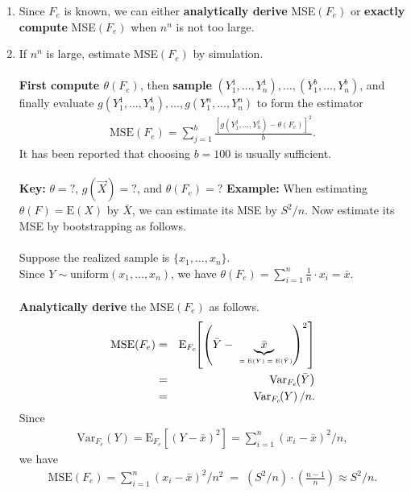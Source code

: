 \documentclass[12pt]{article}
\begin{document}
\begin{enumerate}
\item  Since $F_e$ is known, we can either {\bf analytically derive}
\mbox{MSE$(F_e)$} or  {\bf exactly compute} \mbox{MSE$(F_e)$} when
$n^n$ is not too large.
\\
\item If $n^n$ is large, estimate \mbox{MSE$(F_e)$} by simulation. \\\\
{\bf First compute $\theta(F_e)$}, then {\bf sample}
$(Y_1^1,\ldots,Y_n^1), \ldots, (Y_1^b,\ldots,Y_n^b)$, and finally
evaluate $g(Y_1^1,\ldots,Y_n^1),\ldots, g(Y_1^n,\ldots,Y_n^n)$ to
form the estimator
\begin{eqnarray*}
{\widehat {\mbox{MSE}}} (F_e) =
\sum_{j=1}^b\frac{[g(Y_1^j,\ldots,Y_n^j)-\theta(F_e)]^2}{b}.
\end{eqnarray*}
It has been
reported that choosing $b=100$ is usually sufficient.
\\\\
{\bf Key:} $\theta=?$,  $g({\vec X})=?$, and $\theta(F_e)=?$
\newpage
{\bf Example:} When estimating $\theta(F)={\mbox{E}}(X)$  by ${\bar
X}$, we can estimate its MSE by $S^2/n$. Now estimate its MSE by
bootstrapping as follows.
\\\\
Suppose the realized sample is $\{x_1,\ldots,x_n\}$. \\
Since $Y\sim
\mbox{uniform}(x_1,\ldots,x_n)$, we have
$\theta(F_e)=\sum_{i=1}^n\frac{1}{n}\cdot x_i={\bar x}$.
\\\\
{\bf Analytically derive} the MSE$(F_e)$ as follows.
\begin{eqnarray*}
\mbox{MSE}(F_e) &=&\mbox{E}_{F_e}\!\!\left[\left({\bar
Y}-\underbrace{{\bar x}}_{\mbox{
                     \tiny $=\mbox{E}(Y)=\mbox{E}({\bar Y})$}}
\right)^2
\right]\\
&=&\mbox{Var}_{F_e}\!\!\left({\bar Y}\right)%
\\
&=&\mbox{Var}_{F_e}\!\!\left( Y \right)/n.
 \end{eqnarray*}
 Since
\begin{eqnarray*}
\mbox{Var}_{F_e}\!\!\left( Y \right)=\mbox{E}_{F_e}\!\!\left[\left(
Y-{\bar x} \right)^2 \right]=\sum_{i=1}^n(x_i-{\bar x})^2/n,
\end{eqnarray*}
we have
\begin{eqnarray*}
\mbox{MSE}(F_e) =\sum_{i=1}^n(x_i-{\bar x})^2/n^2\;=\;(S^2/n)\cdot
\left(\frac{n-1}{n}\right)\approx  S^2/n.
\end{eqnarray*}
\end{enumerate}
\end{document}
